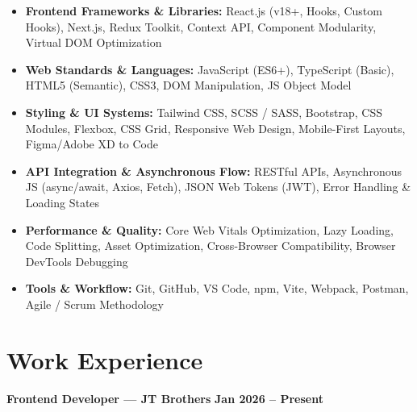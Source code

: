 \documentclass[a4paper,10pt]{article}
\begin{document}
\begin{itemize}

    \item \textbf{Frontend Frameworks \& Libraries:}
    React.js (v18+, Hooks, Custom Hooks), Next.js, Redux Toolkit,
    Context API, Component Modularity, Virtual DOM Optimization

    \item \textbf{Web Standards \& Languages:}
    JavaScript (ES6+), TypeScript (Basic), HTML5 (Semantic), CSS3,
    DOM Manipulation, JS Object Model

    \item \textbf{Styling \& UI Systems:}
    Tailwind CSS, SCSS / SASS, Bootstrap, CSS Modules, Flexbox, CSS Grid,
    Responsive Web Design, Mobile-First Layouts, Figma/Adobe XD to Code

    \item \textbf{API Integration \& Asynchronous Flow:}
    RESTful APIs, Asynchronous JS (async/await, Axios, Fetch),
    JSON Web Tokens (JWT), Error Handling \& Loading States

    \item \textbf{Performance \& Quality:}
    Core Web Vitals Optimization, Lazy Loading, Code Splitting, Asset Optimization,
    Cross-Browser Compatibility, Browser DevTools Debugging

    \item \textbf{Tools \& Workflow:}
    Git, GitHub, VS Code, npm, Vite, Webpack, Postman, Agile / Scrum Methodology

\end{itemize}

\section*{Work Experience}

\textbf{Frontend Developer --- JT Brothers}
\hfill
\textbf{Jan 2026 -- Present}
\end{document}
